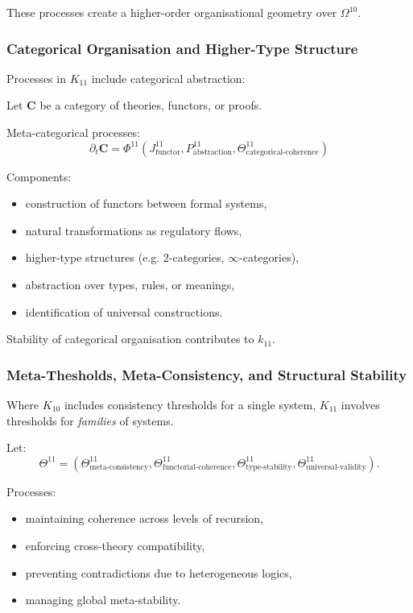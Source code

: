 These processes create a higher-order organisational geometry over $\Omega^{10}$.

\subsubsection{Categorical Organisation and Higher-Type Structure}

Processes in $K_{11}$ include categorical abstraction:

Let $\mathbf{C}$ be a category of theories, functors, or proofs.

Meta-categorical processes:
\[
\partial_t \mathbf{C} = 
\Phi^{11}(J^{11}_{\text{functor}}, 
          P^{11}_{\text{abstraction}}, 
          \Theta^{11}_{\text{categorical-coherence}})
\]

Components:
\begin{itemize}
    \item construction of functors between formal systems,
    \item natural transformations as regulatory flows,
    \item higher-type structures (e.g. 2-categories, $\infty$-categories),
    \item abstraction over types, rules, or meanings,
    \item identification of universal constructions.
\end{itemize}

Stability of categorical organisation contributes to $k_{11}$.

\subsubsection{Meta-Thesholds, Meta-Consistency, and Structural Stability}

Where $K_{10}$ includes consistency thresholds for a single system,  
$K_{11}$ involves thresholds for \emph{families} of systems.

Let:
\[
\Theta^{11} = 
(\Theta^{11}_{\text{meta-consistency}},
 \Theta^{11}_{\text{functorial-coherence}},
 \Theta^{11}_{\text{type-stability}},
 \Theta^{11}_{\text{universal-validity}}).
\]

Processes:
\begin{itemize}
    \item maintaining coherence across levels of recursion,
    \item enforcing cross-theory compatibility,
    \item preventing contradictions due to heterogeneous logics,
    \item managing global meta-stability.
\end{itemize}


